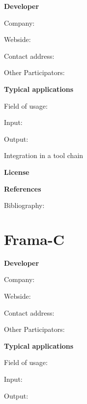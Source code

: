 \documentclass{./template/openetcs2}
\begin{document}
	\textbf{Developer}

	Company: 

	Webside:

	Contact address:

	Other  Participators:



	\textbf{Typical applications}

	Field of usage:


	Input:

	Output:





	Integration in a tool chain



	\textbf{License}


	\textbf{References}

	Bibliography:


\section{Frama-C}

	\textbf{Developer}

	Company: 

	Webside:

	Contact address:

	Other  Participators:



	\textbf{Typical applications}

	Field of usage:


	Input:

	Output:

\end{document}
